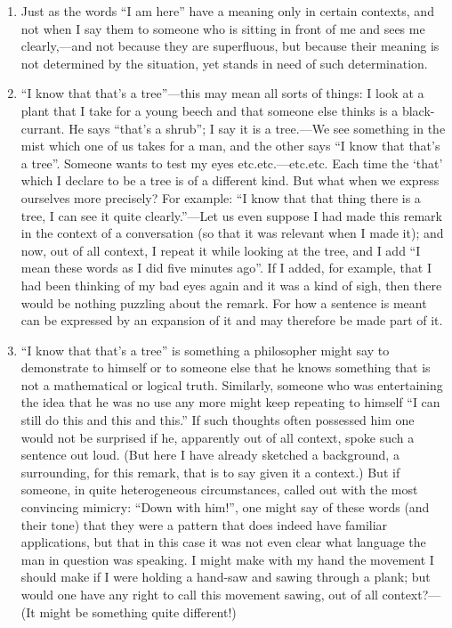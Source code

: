 \documentclass{book}
\begin{document}
\begin{enumerate}
\item
Just as the words ``I am here'' have a meaning only in certain contexts, and
not when I say them to someone who is sitting in front of me and sees me
clearly,---and not because they are superfluous, but because their meaning is
not determined by the situation, yet stands in need of such determination.

\item
``I know that that's a tree''---this may mean all sorts of things: I look at a
plant that I take for a young beech and that someone else thinks is a
black-currant. He says ``that's a shrub''; I say it is a tree.---We see
something in the mist which one of us takes for a man, and the other says ``I
know that that's a tree''. Someone wants to test my eyes etc.etc.---etc.etc.
Each time the `that' which I declare to be a tree is of a different kind.  But
what when we express ourselves more precisely? For example: ``I know that that
thing there is a tree, I can see it quite clearly.''---Let us even suppose I
had made this remark in the context of a conversation (so that it was relevant
when I made it); and now, out of all context, I repeat it while looking at the
tree, and I add ``I mean these words as I did five minutes ago''. If I added,
for example, that I had been thinking of my bad eyes again and it was a kind of
sigh, then there would be nothing puzzling about the remark.  For how a
sentence is meant can be expressed by an expansion of it and may therefore be
made part of it.

\item
``I know that that's a tree'' is something a philosopher might say to
demonstrate to himself or to someone else that he knows something that is not a
mathematical or logical truth. Similarly, someone who was entertaining the idea
that he was no use any more might keep repeating to himself ``I can still do
this and this and this.'' If such thoughts often possessed him one would not be
surprised if he, apparently out of all context, spoke such a sentence out loud.
(But here I have already sketched a background, a surrounding, for this remark,
that is to say given it a context.) But if someone, in quite heterogeneous
circumstances, called out with the most convincing mimicry: ``Down with him!'',
one might say of these words (and their tone) that they were a pattern that
does indeed have familiar applications, but that in this case it was not even
clear what language the man in question was speaking. I might make with my hand
the movement I should make if I were holding a hand-saw and sawing through a
plank; but would one have any right to call this movement sawing, out of all
context?---(It might be something quite different!)


\end{enumerate}
\end{document}
